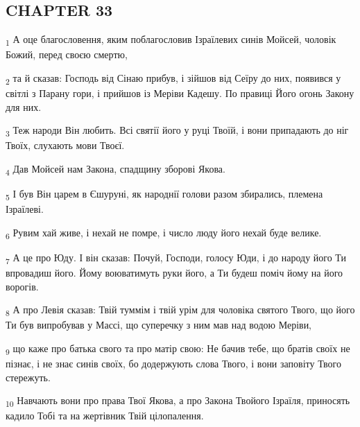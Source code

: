 \subsection{CHAPTER 33}
\begin{tcolorbox}
\textsubscript{1} А оце благословення, яким поблагословив Ізраїлевих синів Мойсей, чоловік Божий, перед своєю смертю,
\end{tcolorbox}
\begin{tcolorbox}
\textsubscript{2} та й сказав: Господь від Сінаю прибув, і зійшов від Сеїру до них, появився у світлі з Парану гори, і прийшов із Меріви Кадешу. По правиці Його огонь Закону для них.
\end{tcolorbox}
\begin{tcolorbox}
\textsubscript{3} Теж народи Він любить. Всі святії його у руці Твоїй, і вони припадають до ніг Твоїх, слухають мови Твоєї.
\end{tcolorbox}
\begin{tcolorbox}
\textsubscript{4} Дав Мойсей нам Закона, спадщину зборові Якова.
\end{tcolorbox}
\begin{tcolorbox}
\textsubscript{5} І був Він царем в Єшуруні, як народнії голови разом збирались, племена Ізраїлеві.
\end{tcolorbox}
\begin{tcolorbox}
\textsubscript{6} Рувим хай живе, і нехай не помре, і число люду його нехай буде велике.
\end{tcolorbox}
\begin{tcolorbox}
\textsubscript{7} А це про Юду. І він сказав: Почуй, Господи, голосу Юди, і до народу його Ти впровадиш його. Йому воюватимуть руки його, а Ти будеш поміч йому на його ворогів.
\end{tcolorbox}
\begin{tcolorbox}
\textsubscript{8} А про Левія сказав: Твій туммім і твій урім для чоловіка святого Твого, що його Ти був випробував у Массі, що суперечку з ним мав над водою Меріви,
\end{tcolorbox}
\begin{tcolorbox}
\textsubscript{9} що каже про батька свого та про матір свою: Не бачив тебе, що братів своїх не пізнає, і не знає синів своїх, бо додержують слова Твого, і вони заповіту Твого стережуть.
\end{tcolorbox}
\begin{tcolorbox}
\textsubscript{10} Навчають вони про права Твої Якова, а про Закона Твойого Ізраїля, приносять кадило Тобі та на жертівник Твій цілопалення.
\end{tcolorbox}
